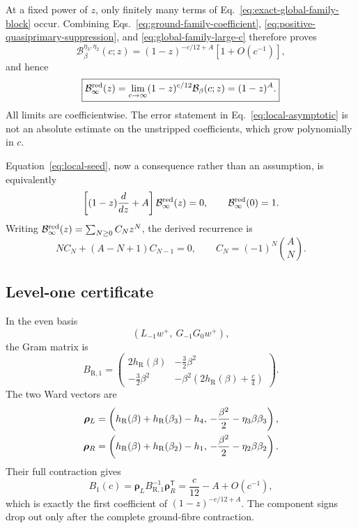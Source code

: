 \documentclass[11pt]{article}
\newcommand{\R}{\mathrm R}
\newcommand{\B}{\mathcal B}
\begin{document}
At a fixed power of \(z\), only finitely many terms of
Eq.~\eqref{eq:exact-global-family-block} occur.  Combining
Eqs.~\eqref{eq:ground-family-coefficient},
\eqref{eq:positive-quasiprimary-suppression}, and
\eqref{eq:global-family-large-c} therefore proves
\begin{equation}
 \boxed{
 \B_\beta^{\eta_3,\eta_2}(c;z)
 =
 (1-z)^{-c/12+A}
 \left[1+O(c^{-1})\right],}
 \label{eq:local-asymptotic}
\end{equation}
and hence
\begin{equation}
 \boxed{
 \B_\infty^{\rm red}(z)
 =
 \lim_{c\to\infty}(1-z)^{c/12}\B_\beta(c;z)
 =(1-z)^A.}
 \label{eq:local-seed}
\end{equation}
All limits are coefficientwise.  The error statement in
Eq.~\eqref{eq:local-asymptotic} is not an absolute estimate on the
unstripped coefficients, which grow polynomially in \(c\).

Equation~\eqref{eq:local-seed}, now a consequence rather than an
assumption, is equivalently
\begin{equation}
 \left[(1-z)\frac{d}{dz}+A\right]\B_\infty^{\rm red}(z)=0,
 \qquad
 \B_\infty^{\rm red}(0)=1.
 \label{eq:contracted-ward-equation}
\end{equation}
Writing
\(\B_\infty^{\rm red}(z)=\sum_{N\ge0}C_Nz^N\), the derived recurrence is
\begin{equation}
 N C_N+(A-N+1)C_{N-1}=0,
 \qquad
 C_N=(-1)^N\binom{A}{N}.
 \label{eq:derived-level-recurrence}
\end{equation}

\subsection{Level-one certificate}

In the even basis
\begin{equation}
 \left(L_{-1}w^+,\ G_{-1}G_0w^+\right),
\end{equation}
the Gram matrix is
\begin{equation}
 B_{\R,1}=
 \begin{pmatrix}
 2h_\R(\beta)&-\frac32\beta^2\\
 -\frac32\beta^2&
 -\beta^2\left(2h_\R(\beta)+\frac c4\right)
 \end{pmatrix}.
 \label{eq:level-one-gram}
\end{equation}
The two Ward vectors are
\begin{align}
 \bm\rho_L
 &=
 \left(
 h_\R(\beta)+h_\R(\beta_3)-h_4,\,
 -\frac{\beta^2}{2}-\eta_3\beta\beta_3
 \right),
 \notag\\
 \bm\rho_R
 &=
 \left(
 h_\R(\beta)+h_\R(\beta_2)-h_1,\,
 -\frac{\beta^2}{2}-\eta_2\beta\beta_2
 \right).
 \label{eq:level-one-ward}
\end{align}
Their full contraction gives
\begin{equation}
 B_1(c)=\bm\rho_LB_{\R,1}^{-1}\bm\rho_R^{\mathsf T}
 =
 \frac c{12}-A+O(c^{-1}),
 \label{eq:level-one-result}
\end{equation}
which is exactly the first coefficient of
\((1-z)^{-c/12+A}\).  The component signs drop out only after the
complete ground-fibre contraction.
\end{document}
